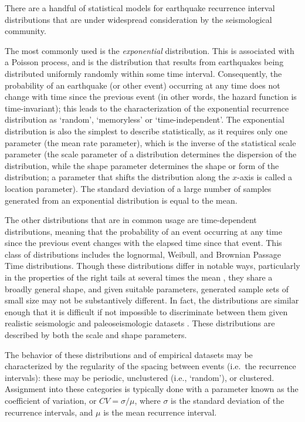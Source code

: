 \documentclass[se, manuscript]{copernicus}
\begin{document}
There are a handful of statistical models for earthquake recurrence
interval distributions that are under widespread consideration by the
seismological community.

The most commonly used is the \emph{exponential} distribution. This is
associated with a Poisson process, and is the distribution that results
from earthquakes being distributed uniformly randomly within some time interval.
Consequently, the probability of an earthquake (or other event) occurring at any
time does not change with time since the previous event (in other words, the
hazard function is time-invariant); this leads to the characterization of the
exponential recurrence distribution as `random', `memoryless' or
`time-independent'. The exponential distribution is also the simplest to
describe statistically, as it requires only one parameter (the mean rate
parameter), which is the inverse of the statistical scale parameter (the scale 
parameter of a distribution determines the dispersion of the distribution, 
while the shape parameter determines the shape or form of the distribution; a 
parameter that shifts the distribution along the $x$-axis is called a location 
parameter).  The standard deviation of a large number of samples generated from 
an exponential distribution is equal to the mean.

The other distributions that are in common usage are time-dependent
distributions, meaning that the probability of an event occurring at any
time since the previous event changes with the elapsed time since that
event. This class of distributions includes the lognormal, Weibull, and
Brownian Passage Time \citep{matthews_brownian_2002} distributions.
Though these distributions differ in notable ways, particularly in the
properties of the right tails at several times the mean
\citep{davis_longer_1989,matthews_brownian_2002}, they share a broadly
general shape, and given suitable parameters, generated sample sets of
small size may not be substantively different. In fact, the
distributions are similar enough that it is difficult if not impossible
to discriminate between them given realistic seismologic and
paleoseismologic datasets
\citep{matthews_brownian_2002,ogata_estimating_1999}. These
distributions are described by both the scale and shape parameters.

The behavior of these distributions and of empirical datasets may be
characterized by the regularity of the spacing between events (i.e.~the
recurrence intervals): these may be periodic, unclustered (i.e.,
`random'), or clustered. Assignment into these categories is typically
done with a parameter known as the coefficient of variation, or
\(CV = \sigma / \mu\), where \(\sigma\) is the standard deviation of
the recurrence intervals, and \(\mu\) is the mean recurrence interval.
\end{document}

